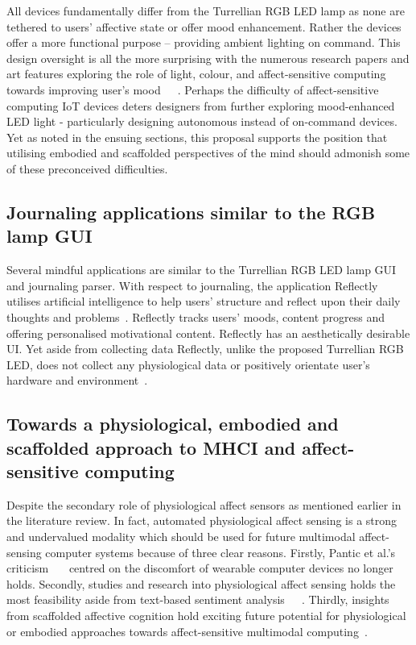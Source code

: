 \documentclass{sigchi}
\begin{document}
All devices fundamentally differ from the Turrellian RGB LED lamp as none are tethered to users’ affective state or offer mood enhancement. Rather the devices offer a more functional purpose – providing ambient lighting on command. This design oversight is all the more surprising with the numerous research papers and art features exploring the role of light, colour, and affect-sensitive computing towards improving user’s mood~\cite{lee2019effects}~\cite{wardono2012effects}~\cite{yang2015lighting}. Perhaps the difficulty of affect-sensitive computing IoT devices deters designers from further exploring mood-enhanced LED light - particularly designing autonomous instead of on-command devices. Yet as noted in the ensuing sections, this proposal supports the position that utilising embodied and scaffolded perspectives of the mind should admonish some of these preconceived difficulties. 

\subsection{Journaling applications similar to the RGB lamp GUI}

Several mindful applications are similar to the Turrellian RGB LED lamp GUI and journaling parser. With respect to journaling, the application Reflectly utilises artificial intelligence to help users’ structure and reflect upon their daily thoughts and problems~\cite{Reflectly01}. Reflectly tracks users’ moods, content progress and offering personalised motivational content. Reflectly has an aesthetically desirable UI. Yet aside from collecting data Reflectly, unlike the proposed Turrellian RGB LED, does not collect any physiological data or positively orientate user’s hardware and environment~\cite{Reflectly01}.

\subsection{Towards a physiological, embodied and scaffolded approach to MHCI and affect-sensitive computing}

Despite the secondary role of physiological affect sensors as mentioned earlier in the literature review. In fact, automated physiological affect sensing is a strong and undervalued modality which should be used for future multimodal affect-sensing computer systems because of three clear reasons. Firstly, Pantic et al.’s criticism~\cite{pantic2003toward}~\cite{pantic2008human}~\cite{6634207} centred on the discomfort of wearable computer devices no longer holds. Secondly, studies and research into physiological affect sensing holds the most feasibility aside from text-based sentiment analysis~\cite{goshvarpour2017fusion}~\cite{goshvarpour2017indices}~\cite{goshvarpour2017discrimination}. Thirdly, insights from scaffolded affective cognition hold exciting future potential for physiological or embodied approaches towards affect-sensitive multimodal computing~\cite{colombetti2015scaffoldings}. 
\end{document}
